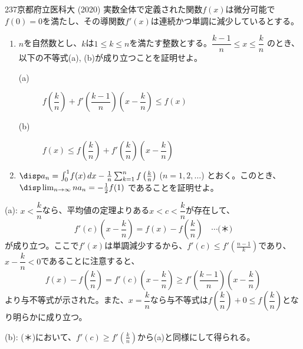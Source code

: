 \begin{prob}{237}{}{京都府立医科大 (2020)}
 実数全体で定義された関数$f(x)$は微分可能で $f(0)=0$を満たし、その導関数$f'(x)$は連続かつ単調に減少しているとする。
 \begin{enumerate}
  \item $n$を自然数とし、$k$は$1\le k\le n$を満たす整数とする。$\dfrac{k-1}{n}\le x\le\dfrac{k}{n}$ のとき、以下の不等式(a), (b)が成り立つことを証明せよ。
  \begin{description}
   \item[(a)] $f\left(\dfrac{k}{n}\right)+f'\left(\dfrac{k-1}{n}\right)\left(x-\dfrac{k}{n}\right)\le f(x)$
   \item[(b)] $f(x)\le f\left(\dfrac{k}{n}\right)+f'\left(\dfrac{k}{n}\right)\left(x-\dfrac{k}{n}\right)$
  \end{description}
  \item $\disp a_n=\int_0^1\!f(x) \,dx-\frac{1}{n}\sum_{k=1}^nf\left(\frac{k}{n}\right)$ ($n=1,2,\dots$) とおく。このとき、$\disp \lim_{n\to\infty} na_n=-\frac{1}{2}f(1)$ であることを証明せよ。
 \end{enumerate}
\end{prob}

(a): $x<\dfrac{k}{n}$なら、平均値の定理よりある$x<c<\dfrac{k}{n}$が存在して、
\[ f'(c)\left(x-\frac{k}{n}\right)=f(x)-f(\frac{k}{n}) \quad\cdots\text{(＊)} \]
が成り立つ。ここで$f'(x)$は単調減少するから、$f'(c)\le f'(\frac{n-1}{k})$であり、$x-\dfrac{k}{n}<0$であることに注意すると、
\[ f(x)-f(\frac{k}{n})=f'(c)\left(x-\frac{k}{n}\right)\ge f'\left(\frac{k-1}{n}\right)\left(x-\frac{k}{n}\right) \]
より与不等式が示された。また、$x=\dfrac{k}{n}$なら与不等式は$f\left(\dfrac{k}{n}\right)+0\le f\left(\dfrac{k}{n}\right)$となり明らかに成り立つ。

(b): (＊)において、$f'(c)\ge f'(\frac{k}{n})$から(a)と同様にして得られる。

